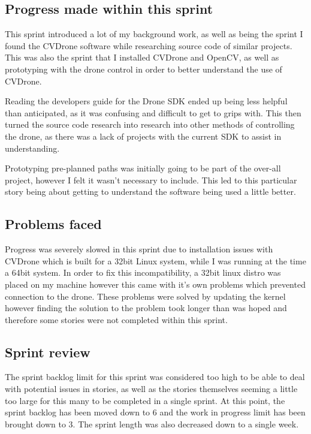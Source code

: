 \subsection{Progress made within this sprint}
This sprint introduced a lot of my background work, as well as being the sprint I found the CVDrone software \cite{CVDrone} while researching source code of similar projects. This was also the sprint that I installed CVDrone and OpenCV, as well as prototyping with the drone control in order to better understand the use of CVDrone.

Reading the developers guide for the Drone SDK\cite{DroneDevGuide} ended up being less helpful than anticipated, as it was confusing and difficult to get to grips with. This then turned the source code research into research into other methods of controlling the drone, as there was a lack of projects with the current SDK to assist in understanding.

Prototyping pre-planned paths was initially going to be part of the over-all project, however I felt it wasn't necessary to include. This led to this particular story being about getting to understand the software being used a little better.

\subsection{Problems faced}
Progress was severely slowed in this sprint due to installation issues with CVDrone which is built for a 32bit Linux system, while I was running at the time a 64bit system. In order to fix this incompatibility, a 32bit linux distro was placed on my machine however this came with it's own problems which prevented connection to the drone. These problems were solved by updating the kernel however finding the solution to the problem took longer than was hoped and therefore some stories were not completed within this sprint.

\subsection{Sprint review}
The sprint backlog limit for this sprint was considered too high to be able to deal with potential issues in stories, as well as the stories themselves seeming a little too large for this many to be completed in a single sprint. At this point, the sprint backlog has been moved down to 6 and the work in progress limit has been brought down to 3. The sprint length was also decreased down to a single week.

